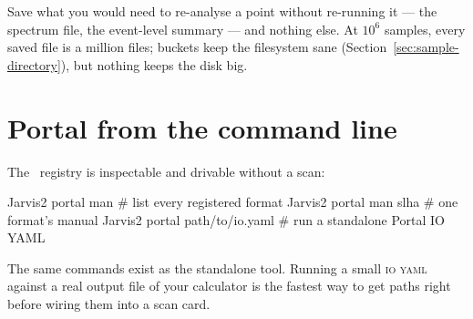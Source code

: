 \begin{jtip}
Save what you would need to re-analyse a point without re-running it --- the spectrum
file, the event-level summary --- and nothing else. At $10^6$ samples, every saved file
is a million files; buckets keep the filesystem sane
(Section~\ref{sec:sample-directory}), but nothing keeps the disk big.
\end{jtip}

\section{Portal from the command line}
\label{sec:portal-cli}

The \Portal\ registry is inspectable and drivable without a scan:

\begin{terminal}
\begin{jcmd}
Jarvis2 portal man            # list every registered format
Jarvis2 portal man slha       # one format's manual
Jarvis2 portal path/to/io.yaml   # run a standalone Portal IO YAML
\end{jcmd}
\end{terminal}

The same commands exist as the standalone  tool. Running a small
\textsc{io yaml} against a real output file of your calculator is the fastest way to get
 paths right before wiring them into a scan card.

